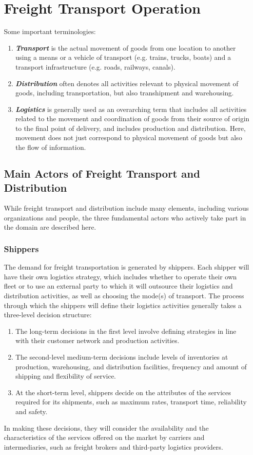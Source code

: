 \chapter{Freight Transport Operation}
%
Some important terminologies:
\begin{enumerate}
	\item \textbf{\textit{Transport}} is the actual movement of goods from one location to another using a means or a vehicle of transport (e.g. trains, trucks, boats) and a transport infrastructure (e.g. roads, railways, canals).
	\item \textbf{\textit{Distribution}} often denotes all activities relevant to physical movement of goods, including transportation, but also transhipment and warehousing.
	\item \textbf{\textit{Logistics}} is generally used as an overarching term that includes all activities related to the movement and coordination of goods from their source of origin to the final point of delivery, and includes production and distribution. Here, movement does not just correspond to physical movement of goods but also the flow of information.
\end{enumerate}
%
\section{Main Actors of Freight Transport and Distribution}
While freight transport and distribution include many elements, including various organizations and people, the three fundamental actors who actively take part in the domain are described here.
\subsection{Shippers}
The demand for freight transportation is generated by shippers. Each shipper will have their own logistics strategy, which includes whether to operate their own fleet or to use an external party to which it will outsource their logistics and distribution activities, as well as choosing the mode(s) of transport. The process through which the shippers will define their logistics activities generally takes a three-level decision structure:
\begin{enumerate}
	\item The long-term decisions in the first level involve defining strategies in line with their customer network and production activities.
	\item The second-level medium-term decisions include levels of inventories at production, warehousing, and distribution facilities, frequency and amount of shipping and flexibility of service.
	\item At the short-term level, shippers decide on the attributes of the services required for its shipments, such as maximum rates, transport time, reliability and safety.
\end{enumerate}
%
In making these decisions, they will consider the availability and the characteristics of the services offered on the market by carriers and intermediaries, such as freight brokers and third-party logistics providers.
